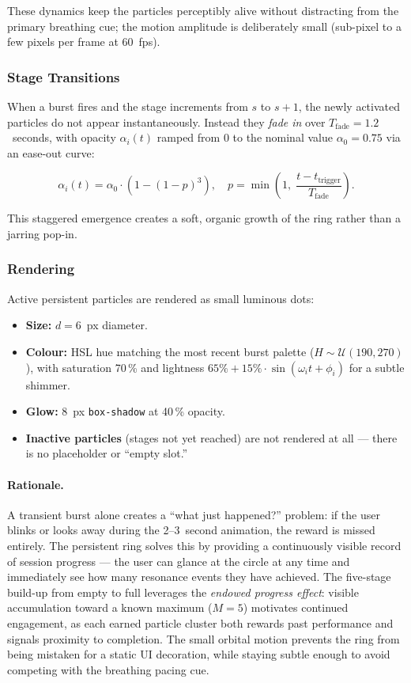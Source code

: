 \documentclass[11pt,a4paper]{article}
\begin{document}
These dynamics keep the particles perceptibly alive without distracting
from the primary breathing cue; the motion amplitude is deliberately
small (sub-pixel to a few pixels per frame at 60~fps).

\subsubsection{Stage Transitions}

When a burst fires and the stage increments from $s$ to $s+1$, the
newly activated particles do not appear instantaneously. Instead they
\textit{fade in} over $T_{\text{fade}} = 1.2$~seconds, with opacity
$\alpha_i(t)$ ramped from 0 to the nominal value $\alpha_0 = 0.75$
via an ease-out curve:

\[
\alpha_i(t) = \alpha_0 \cdot \left(1 - (1 - p)^3\right), \quad
p = \min\!\left(1,\; \frac{t - t_{\text{trigger}}}{T_{\text{fade}}}\right).
\]

This staggered emergence creates a soft, organic growth of the ring
rather than a jarring pop-in.

\subsubsection{Rendering}

Active persistent particles are rendered as small luminous dots:

\begin{itemize}
  \item \textbf{Size:} $d = 6$~px diameter.
  \item \textbf{Colour:} HSL hue matching the most recent burst palette
    ($H \sim \mathcal{U}(190, 270)$), with saturation 70\,\% and
    lightness $65\% + 15\% \cdot \sin(\omega_i t + \phi_i)$ for a subtle
    shimmer.
  \item \textbf{Glow:} 8~px \texttt{box-shadow} at 40\,\% opacity.
  \item \textbf{Inactive particles} (stages not yet reached) are not
    rendered at all — there is no placeholder or ``empty slot.''
\end{itemize}

\paragraph{Rationale.}
A transient burst alone creates a ``what just happened?'' problem: if
the user blinks or looks away during the 2--3~second animation, the
reward is missed entirely. The persistent ring solves this by providing
a continuously visible record of session progress — the user can glance
at the circle at any time and immediately see how many resonance events
they have achieved. The five-stage build-up from empty to full leverages
the \textit{endowed progress effect}: visible accumulation toward a
known maximum ($M = 5$) motivates continued engagement, as each earned
particle cluster both rewards past performance and signals proximity to
completion. The small orbital motion prevents the ring from being
mistaken for a static UI decoration, while staying subtle enough to
avoid competing with the breathing pacing cue.
\end{document}
